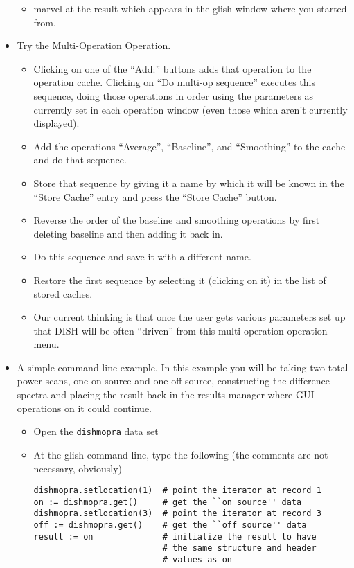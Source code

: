 \begin{itemize}
\begin{itemize}
\item marvel at the result which appears in the glish window where you
started from.
\end{itemize}
\item Try the Multi-Operation Operation.
\begin{itemize}
\item Clicking
on one of the ``Add:'' buttons adds that operation to the operation
cache.  Clicking on ``Do multi-op sequence'' executes this sequence,
doing those operations in order using the parameters as currently set
in each operation window (even those which aren't currently displayed).
\item Add the operations ``Average'', ``Baseline'', and ``Smoothing'' to
the cache and do that sequence.
\item Store that sequence by giving it a name by which it will be known 
in the ``Store Cache'' entry and press the ``Store Cache'' button.
\item Reverse the order of the baseline and smoothing operations by
first deleting baseline and then adding it back in.
\item Do this sequence and save it with a different name.
\item Restore the first sequence by selecting it (clicking on it) in the
list of stored caches.
\item Our current thinking is that once the user gets various parameters
set up that DISH will be often ``driven'' from this multi-operation
operation menu.
\end{itemize}
\item A simple command-line example.
In this example you will be taking two total power scans, one on-source
and one off-source, constructing the difference spectra and
placing the result back in the results manager where GUI operations
on it could continue.
\begin{itemize}
\item Open the {\tt dishmopra} data set
\item At the glish command line, type the following (the comments are not
necessary, obviously)
\begin{verbatim}
dishmopra.setlocation(1)  # point the iterator at record 1
on := dishmopra.get()     # get the ``on source'' data
dishmopra.setlocation(3)  # point the iterator at record 3
off := dishmopra.get()    # get the ``off source'' data
result := on              # initialize the result to have
                          # the same structure and header
                          # values as on

\end{verbatim}
\end{itemize}
\end{itemize}
